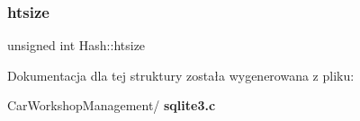 \mbox{\label{struct_hash_a072258e24a38e09175f1308deb013bc8}} 
\subsubsection{htsize}
{\footnotesize\ttfamily unsigned int Hash\+::htsize}



Dokumentacja dla tej struktury została wygenerowana z pliku\+:\begin{DoxyCompactItemize}
\item 
Car\+Workshop\+Management/\textbf{ sqlite3.\+c}\end{DoxyCompactItemize}
